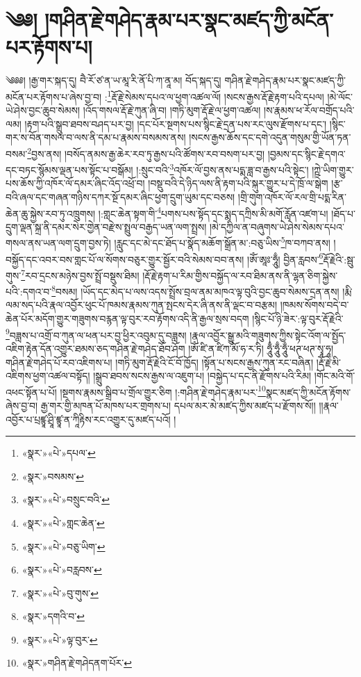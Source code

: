 \chapter{༄༅། །གཤིན་རྗེ་གཤེད་རྣམ་པར་སྣང་མཛད་ཀྱི་མངོན་པར་རྟོགས་པ།}༄༅༅། །རྒྱ་གར་སྐད་དུ། བཻ་རོ་ཙ་ན་ཡ་མཱ་རི་ནོ་པི་ཀ་ནཱ་མ། བོད་སྐད་དུ། གཤིན་རྗེ་གཤེད་རྣམ་པར་སྣང་མཛད་ཀྱི་མངོན་པར་རྟོགས་པ་ཞེས་བྱ་བ། :\footnote{«སྣར་»«པེ་»དཔལ་}རྡོ་རྗེ་སེམས་དཔའ་ལ་ཕྱག་འཚལ་ལོ། །སངས་རྒྱས་རྡོ་རྗེ་རྟག་པའི་དཔལ། །མེ་ལོང་ཡེ་ཤེས་བྱང་ཆུབ་སེམས། །འོད་གསལ་རྡོ་རྗེ་ཀུན་ཞི་བ། །གཏི་མུག་རྡོ་རྗེ་ལ་ཕྱག་འཚལ། །ས་རྣམས་ཕ་རོལ་བགྲོད་པའི་ལམ། །རྟག་པའི་སྒྲུབ་ཐབས་བཤད་པར་བྱ། །དང་པོར་སྔགས་པས་སྙིང་རྗེ་དྲན་པས་རང་ལུས་རྫོགས་པ་དང་། །སྙིང་གར་ས་བོན་གསལ་བ་ལས་ནི་དམ་པ་རྣམས་བསམས་ནས། །སངས་རྒྱས་ཆོས་དང་དགེ་འདུན་གསུམ་གྱི་ཡོན་ཏན་བསམ་\footnote{«སྣར་»བསམས་}བྱས་ནས། །བསོད་ནམས་རྒྱ་ཆེར་རབ་ཏུ་རྒྱས་པའི་ཚོགས་རབ་བསག་པར་བྱ། །བྱམས་དང་སྙིང་རྗེ་དགའ་དང་བཏང་སྙོམས་ལྡན་པས་སྟོང་པ་བསྒོམ། །:སྲུང་བའི་\footnote{«སྣར་»«པེ་»བསྲུང་བའི་}འཁོར་ལོ་བྱས་ནས་པདྨ་ཟླ་བ་རྒྱས་པའི་སྟེང་། །ཀྵེ་ཡིག་གྱུར་པས་ཆོས་ཀྱི་འཁོར་ལོ་དམར་ཞིང་འོད་འཕྲོ་བ། །བསྡུ་བའི་དེ་ཉིད་ལས་ནི་རྟག་པའི་སྐུར་གྱུར་པ་དེ་ཁྲོ་ལ་སྒེག །རྩ་བའི་ཞལ་དང་གཞན་གཉིས་དཀར་སྔོ་དམར་ཞིང་ཕྱག་དྲུག་ཡུམ་དང་བཅས། །གྲི་གུག་འཁོར་ལོ་རལ་གྲི་པདྨ་རིན་ཆེན་ཆུ་སྐྱེས་རབ་ཏུ་འཁྲུགས། །:གླང་ཆེན་སྟག་གི་\footnote{«སྣར་»«པེ་»གླང་ཆེན་}པགས་པས་སྟོད་དང་སྨད་དཀྲིས་མི་མགོ་རློན་འཛག་པ། །ཐོད་པ་དྲུག་ལྡན་སྐྲ་ནི་དམར་སེར་གྱེན་བརྫེས་སྤྲུལ་བརྒྱད་ཡན་ལག་སྤྲས། །མེ་དཀྱིལ་ན་བཞུགས་ཡེ་ཤེས་སེམས་དཔའ་གསལ་ནས་ཡན་ལག་དྲུག་བྱས་ཏེ། །རླུང་དང་མེ་དང་ཐོད་པ་སྣོད་མཆོག་སྒྲོན་མ་:བཅུ་ཡིས་\footnote{«སྣར་»«པེ་»བཅུ་ཡིག་}ཁ་བཀབ་ནས། །བསྐྱོད་དང་འབར་བས་གླང་པོ་ལ་སོགས་བཅུར་གྱུར་སྦྱོར་བའི་སེམས་བབ་ནས། །ཨོཾ་ཨཱཿ་ཧཱུྃ། བྱིན་རླབས་\footnote{«སྣར་»«པེ་»བརླབས་}རྡོ་རྗེའི་:སྦུ་གུས་\footnote{«སྣར་»«པེ་»བུ་གུས་}རབ་དྲངས་མཉེས་བྱས་སྤྲོ་བསྡུས་ཐིམ། །རྡོ་རྗེ་རྟག་པ་རིམ་གྱིས་བསྐྱོད་ལ་རབ་ཐིམ་ནས་ནི་ལྷན་ཅིག་སྐྱེས་པའི་:དགའ་བ་\footnote{«སྣར་»དགའི་བ་}བསམ། །ཡོད་དང་མེད་པ་ལས་འདས་སྤྲོས་བྲལ་ནམ་མཁའ་ལྟ་བུའི་བྱང་ཆུབ་སེམས་དྲན་ནས། །རྨི་ལམ་སད་པའི་རྣལ་འབྱོར་ཕུང་པོ་ཁམས་རྣམས་ཀུན་སྤངས་དེར་ཞི་ནས་ནི་ལྡང་བ་བརྩམ། །ཁམས་སོགས་བདེ་བ་ཆེན་པོར་མདོག་གྱུར་གཟུགས་བརྙན་ལྟ་བུར་རབ་རྟོགས་འདི་ནི་རྒྱལ་སྲས་བདག །སྙིང་པོ་ཉི་ཟེར་:ལྟ་བུར་རྡོ་རྗེའི་\footnote{«སྣར་»«པེ་»ལྟ་བུར་}བཟླས་པ་འགྲོ་བ་ཀུན་ལ་ཕན་པར་བྱ་ཕྱིར་འབུམ་དུ་བཟླས། །རྣལ་འབྱོར་སྒྱུ་མའི་གཟུགས་ཀྱིས་སྟེང་འོག་ལ་སྤྱོད་འཇིག་རྟེན་དོན་འགྱུར་ཐམས་ཅད་གཤིན་རྗེ་གཤེད་ཐོབ་ཤོག །ཨོཾ་ཛི་ན་ཛིཀ་མོ་ཧ་ར་ཏི། ཧཱུྃ་ཧཱུྃ་ཧཱུྃ་ཕཊ་ཕཊ་སྭཱ་ཧཱ། གཤིན་རྗེ་གཤེད་པོ་རབ་འཇིགས་པ། །གཏི་མུག་རྡོ་རྗེའི་ངོ་བོ་ཁྱོད། །སྟོན་པ་སངས་རྒྱས་ཀུན་རང་བཞིན། །རྡོ་རྗེ་མི་འཇིགས་ཕྱག་འཚལ་བསྟོད། །སྒྲུབ་ཐབས་སངས་རྒྱས་ལ་འཇུག་པ། །བསྐྱེད་པ་དང་ནི་རྫོགས་པའི་རིམ། །གོང་མའི་གོ་འཕང་སྟོན་པ་པོ། །སྔགས་རྣམས་སྒྲིབ་པ་གྲོལ་གྱུར་ཅིག །:གཤིན་རྗེ་གཤེད་རྣམ་པར་\footnote{«སྣར་»གཤིན་རྗེ་གཤེདནག་པོར་}སྣང་མཛད་ཀྱི་མངོན་རྟོགས་ཞེས་བྱ་བ། རྒྱ་གར་གྱི་མཁན་པོ་མཁས་པར་གྲགས་པ། དཔལ་མར་མེ་མཛད་ཀྱིས་མཛད་པ་རྫོགས་སོ།། །།རྣལ་འབྱོར་པ་པྲཛྙཱ་ཤྲཱི་ཛྙཱ་ན་ཀཱིརྟིས་རང་འགྱུར་དུ་མཛད་པའོ། ། 